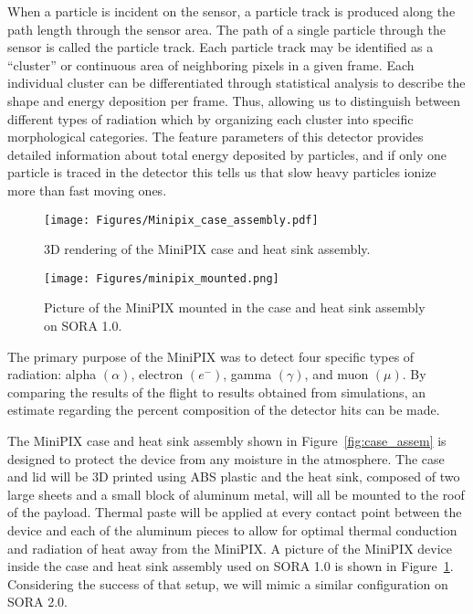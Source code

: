 When a particle is incident on the sensor, a particle track is produced along the path length through the sensor area. The path of a single particle through the sensor is called the particle track.  Each particle track may be identified as a ``cluster'' or continuous area of neighboring pixels in a given frame. Each individual cluster can be differentiated through statistical analysis to describe the shape and energy deposition per frame. Thus, allowing us to distinguish between different types of radiation which by organizing each cluster into specific morphological categories. The feature parameters of this detector provides detailed information about total energy deposited by particles, and if only one particle is traced in the detector this tells us that slow heavy particles ionize more than fast moving ones. 

\begin{figure}[]
  \begin{minipage}[c]{0.49\linewidth}
    \texttt{[image: Figures/Minipix\_case\_assembly.pdf]}
    \caption{3D rendering of the MiniPIX case and heat sink assembly.} %
    \label{fig:case_assem}
  \end{minipage}
  \hfill
  \begin{minipage}[c]{0.49\linewidth}
    \centering
    \texttt{[image: Figures/minipix\_mounted.png]}
    \caption{Picture of the MiniPIX mounted in the case and heat sink assembly on SORA 1.0.} %
    \label{fig:case_assem_pic}
  \end{minipage}
\end{figure}

The primary purpose of the MiniPIX was to detect four specific types of radiation: alpha $(\alpha)$, electron $({e^-})$, gamma $({\gamma})$, and muon $({\mu})$. By comparing the results of the flight to results obtained from simulations, an estimate regarding the percent composition of the detector hits can be made.

The MiniPIX case and heat sink assembly shown in Figure~\ref{fig:case_assem} is designed to protect the device from any moisture in the atmosphere. The case and lid will be 3D printed using ABS plastic and the heat sink, composed of two large sheets and a small block of aluminum metal, will all be mounted to the roof of the payload. Thermal paste will be applied at every contact point between the device and each of the aluminum pieces to allow for optimal thermal conduction and radiation of heat away from the MiniPIX. A picture of the MiniPIX device inside the case and heat sink assembly used on SORA 1.0 is shown in Figure~\ref{fig:case_assem_pic}. Considering the success of that setup, we will mimic a similar configuration on SORA 2.0.


